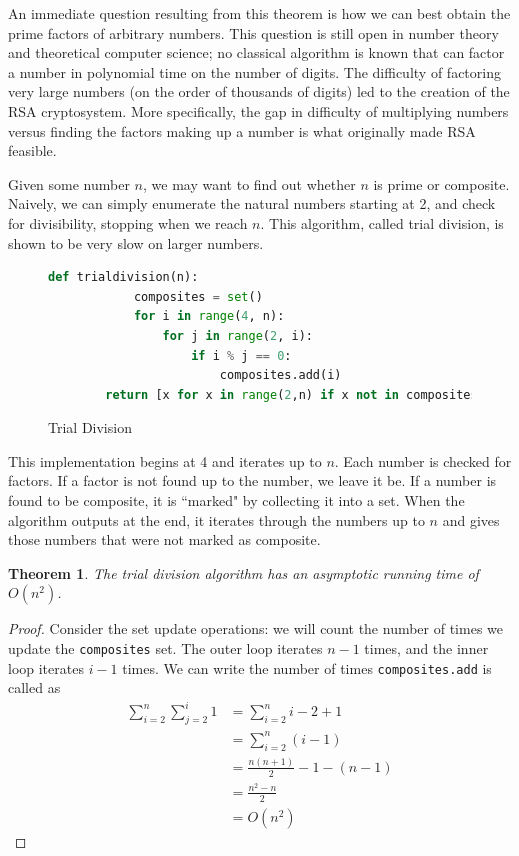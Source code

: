\documentclass{amsart}
\newtheorem{thm}{Theorem}
\theoremstyle{definition}
\theoremstyle{case}
\begin{document}
	An immediate question resulting from this theorem is how we can best obtain the prime factors of arbitrary numbers. This question is still open in number theory and theoretical computer science; no classical algorithm is known that can factor a number in polynomial time on the number of digits. The difficulty of factoring very large numbers (on the order of thousands of digits) led to the creation of the RSA cryptosystem. More specifically, the gap in difficulty of multiplying numbers versus finding the factors making up a number is what originally made RSA feasible.
	
	Given some number $n$, we may want to find out whether $n$ is prime or composite. Naively, we can simply enumerate the natural numbers starting at 2, and check for divisibility, stopping when we reach $n$. This algorithm, called trial division, is shown to be very slow on larger numbers.
	
	\begin{figure}[H]\caption{Trial Division}
		\begin{lstlisting}[language=Python]
		def trialdivision(n):
		    composites = set()
		    for i in range(4, n):
		        for j in range(2, i):
		            if i % j == 0:
		                composites.add(i)
		return [x for x in range(2,n) if x not in composites]
		\end{lstlisting}
	\end{figure}
	
	This implementation begins at 4 and iterates up to $n$. Each number is checked for factors. If a factor is not found up to the number, we leave it be. If a number is found to be composite, it is ``marked" by collecting it into a set. When the algorithm outputs at the end, it iterates through the numbers up to $n$ and gives those numbers that were not marked as composite.
	
	\begin{thm}
		The trial division algorithm has an asymptotic running time of $O(n^2)$.
	\end{thm}
	\begin{proof}
		Consider the set update operations: we will count the number of times we update the \texttt{composites} set. The outer loop iterates $n-1$ times, and the inner loop iterates $i-1$ times. We can write the number of times \texttt{composites.add} is called as
		\begin{equation*}
		\begin{split}
		\sum_{i=2}^{n} \sum_{j=2}^{i} 1 & = \sum_{i=2}^{n} i-2+1 \\
		& = \sum_{i=2}^{n} (i-1) \\
		& = \frac{n(n+1)}{2} - 1 - (n-1) \\
		& = \frac{n^2 - n}{2} \\
		& = O(n^2)
		\end{split}
		\end{equation*}
	\end{proof}
	
\end{document}
